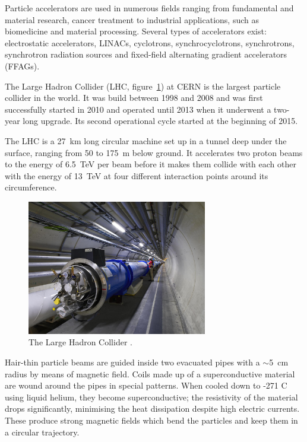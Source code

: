Particle accelerators are used in numerous fields ranging from fundamental and material research, cancer treatment to industrial applications, such as biomedicine and material processing. Several types of accelerators exist: electrostatic accelerators, LINACs, cyclotrons, synchrocyclotrons, synchrotrons, synchrotron radiation sources and fixed-field alternating gradient accelerators (FFAGs).

The Large Hadron Collider (LHC, figure~\ref{fig:lhc}) at CERN is the largest particle collider in the world. It was build between 1998 and 2008 and was first successfully started in 2010 and operated until 2013 when it underwent a two-year long upgrade. Its second operational cycle started at the beginning of 2015.

The LHC is a 27~km long circular machine set up in a tunnel deep under the surface, ranging from 50 to 175~m below ground. It accelerates two proton beams to the energy of 6.5~TeV per beam before it makes them collide with each other with the energy of 13~TeV at four different interaction points around its circumference. 
\begin{figure}[!t]
\centering
\includegraphics[width=0.7\textwidth]{01_introduction/pics/lhc}
\caption{The Large Hadron Collider \cite{Maximilien:1324852}.}
\label{fig:lhc}
\end{figure}
Hair-thin particle beams are guided inside two evacuated pipes with a $\sim$5~cm radius by means of magnetic field. Coils made up of a superconductive material are wound around the pipes in special patterns. When cooled down to -271 \textdegree C using liquid helium, they become superconductive; the resistivity of the material drops significantly, minimising the heat dissipation despite high electric currents. These produce strong magnetic fields which bend the particles and keep them in a circular trajectory. 

